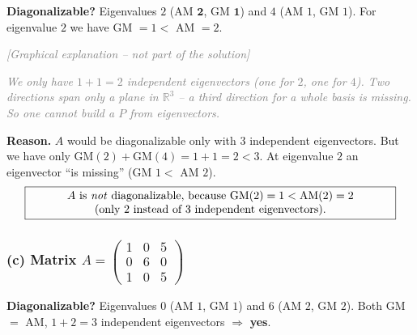 \documentclass[a4paper,12pt]{article}
\newcommand{\grafik}{\textcolor{gray}{\small\textit{[Graphical explanation -- not part of the solution]}}}
\newcommand{\EV}{eigenvector}
\begin{document}
\textbf{Diagonalizable?} Eigenvalues $2$ (AM $\mathbf{2}$, GM $\mathbf{1}$) and $4$ (AM $1$, GM $1$). For eigenvalue $2$ we have GM $= 1 <$ AM $= 2$.

\grafik

\begin{center}
\end{center}

\textcolor{gray}{\small\textit{We only have $1 + 1 = 2$ independent eigenvectors (one for $2$, one for $4$). Two directions span only a \emph{plane} in $\mathbb{R}^3$ -- a third direction for a whole basis is missing. So one cannot build a $P$ from eigenvectors.}}

\textbf{Reason.} $A$ would be diagonalizable only with $3$ independent eigenvectors. But we have only $\text{GM}(2) + \text{GM}(4) = 1 + 1 = 2 < 3$. At eigenvalue $2$ an \EV{} ``is missing'' (GM $1 <$ AM $2$).
\[
\fbox{\parbox{0.93\textwidth}{\centering
$A$ is \emph{not} diagonalizable, because $\text{GM}(2) = 1 < \text{AM}(2) = 2$ \\
(only $2$ instead of $3$ independent eigenvectors).
}}
\]

\subsubsection*{(c) Matrix $A = \left(\begin{smallmatrix} 1 & 0 & 5 \\ 0 & 6 & 0 \\ 1 & 0 & 5 \end{smallmatrix}\right)$}

\textbf{Diagonalizable?} Eigenvalues $0$ (AM $1$, GM $1$) and $6$ (AM $2$, GM $2$). Both GM $=$ AM, $1 + 2 = 3$ independent eigenvectors $\Rightarrow$ \textbf{yes}.
\end{document}
